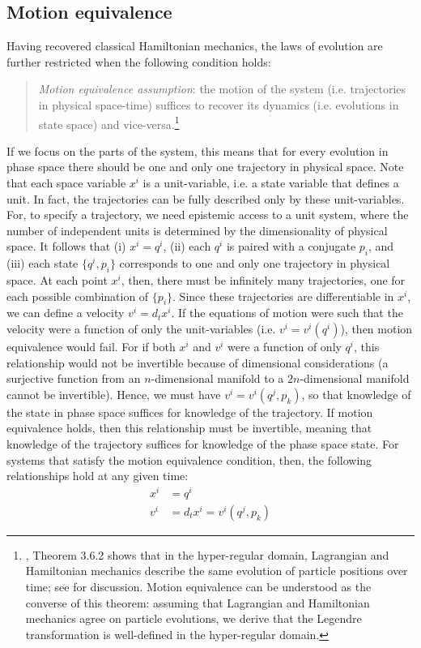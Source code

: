 \documentclass[12pt, english, twoside]{article} %
\newcommand\bs{\begin{singlespace}}
\newcommand\es{\end{singlespace}}
\begin{document}
\subsection{Motion equivalence}
\label{motion}

Having recovered classical Hamiltonian mechanics, the laws of evolution are further restricted when the following condition holds:


\begin{quotation}
\bs \noindent
\textit{Motion equivalence assumption}: the motion of the system (i.e. trajectories in physical space-time) suffices to recover its dynamics (i.e. evolutions in state space) and vice-versa.\footnote{ \textcites[218]{Abraham}, Theorem 3.6.2 shows that in the hyper-regular domain, Lagrangian and Hamiltonian mechanics describe the same evolution of particle positions over time; see \textcites[1180-1181]{Barrett2} for discussion. Motion equivalence can be understood as the converse of this theorem: assuming that Lagrangian and Hamiltonian mechanics agree on particle evolutions, we derive that the Legendre transformation is well-defined in the hyper-regular domain.} \es
\end{quotation}


If we focus on the parts of the system, this means that for every evolution in phase space there should be one and only one trajectory in physical space. Note that each space variable $x^i$ is a unit-variable, i.e. a state variable that defines a unit. In fact, the trajectories can be fully described only by these unit-variables. For, to specify a trajectory, we need epistemic access to a unit system, where the number of independent units is determined by the dimensionality of physical space. It follows that (i) $x^i = q^i$, (ii) each $q^i$ is paired with a conjugate $p_i$, and (iii) each state $\{q^i, p_i\}$ corresponds to one and only one trajectory in physical space. At each point $x^i$, then, there must be infinitely many trajectories, one for each possible combination of $\{p_i\}$. Since these trajectories are differentiable in $x^i$, we can define a velocity $v^i = d_t x^i$. If the equations of motion were such that the velocity were a function of only the unit-variables (i.e. $v^i=v^i(q^i)$), then motion equivalence would fail. For if both $x^i$ and $v^i$ were a function of only $q^i$, this relationship would not be invertible because of dimensional considerations (a surjective function from an $n$-dimensional manifold to a $2n$-dimensional manifold cannot be invertible). Hence, we must have $v^i=v^i(q^j, p_k)$, so that knowledge of the state in phase space suffices for knowledge of the trajectory. If motion equivalence holds, then this relationship must be invertible, meaning that knowledge of the trajectory suffices for knowledge of the phase space state. For systems that satisfy the motion equivalence condition, then, the following relationships hold at any given time:
\begin{equation}\label{weak_equivalence}
\begin{aligned}
x^i &= q^i \\
v^i &= d_t x^i = v^i(q^j, p_k)
\end{aligned}
\end{equation}
\end{document}
